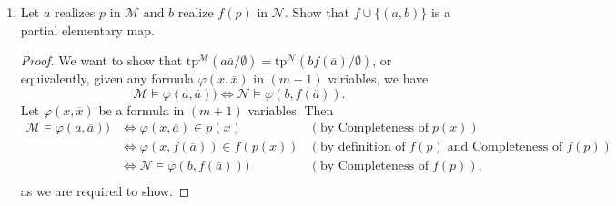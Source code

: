 \documentclass{article}
\begin{document}
\begin{enumerate}[label={\bf Q\arabic*:}]
\begin{enumerate}
        \begin{proof}
          Let $\overline{a}$ denote $(a_1,\ldots,a_m)$. Given any finite
          set of formulas
          $\varphi_1(x,f(\overline{a})),\ldots,\varphi_n(x,f(\overline{a}))$
          in $f(p)$, we need to show that $\mathcal{N}$ realizes their
          conjunction \[\varphi(x,f(\overline{a})):=
          \varphi_1(x,f(\overline{a}))\wedge
          \ldots\wedge\varphi_n(x,f(\overline{a})),\] or equivalently,
          \[\mathcal{N}\models\exists x\; \varphi(x,f(\overline{a})).\]
          Now for each $i\in\{1,\ldots,n\}$, $\varphi_i(x,\overline{a})$ is
          a formula in $p$ by definition of $f(p)$, therefore by
          Completeness and consistency of $p$, $\varphi(x,\overline{a})$ is
          also in $p$. In other words, $\mathcal{M}$ realizes
          $\varphi(x,\overline{a})$, or equivalently,
          \[\mathcal{M}\models\exists x\; \varphi(x,\overline{a}).\]
          Therefore
          $\exists x\; \varphi(x,\overline{x})\in
          \text{tp}^\mathcal{M}(\overline{a}/\emptyset)$, which implies
          $\exists x\; \varphi(x,\overline{x})\in
          \text{tp}^\mathcal{N}(f(\overline{a})/\emptyset)$ since
          $\text{tp}^\mathcal{M}(\overline{a}/\emptyset)=
          \text{tp}^\mathcal{N}(f(\overline{a})/\emptyset)$. Hence
          $\mathcal{N}\models\exists x\; \varphi(x,f(\overline{a}))$ as
          required.
        \end{proof}

      \item Let $a$ realizes $p$ in $\mathcal{M}$ and $b$ realize $f(p)$ in
        $\mathcal{N}$. Show that $f\cup\{(a,b)\}$ is a partial elementary
        map.
        \begin{proof}
          We want to show that
          $\text{tp}^\mathcal{M}(a\overline{a}/\emptyset)
          =\text{tp}^\mathcal{N}(bf(\overline{a})/\emptyset)$, or
          equivalently, given any formula $\varphi(x,\overline{x})$ in
          $(m+1)$ variables, we have
          \[\mathcal{M}\models\varphi(a,\overline{a}))\Leftrightarrow
          \mathcal{N}\models\varphi(b,f(\overline{a})).\]
          Let $\varphi(x,\overline{x})$ be a formula in $(m+1)$ variables.
          Then
          \begin{align*}
            \mathcal{M}\models\varphi(a,\overline{a}))  & \Leftrightarrow
            \varphi(x,\overline{a})\in p(x) & (\text{by Completeness of}\;
              p(x)) \\
              & \Leftrightarrow \varphi(x,f(\overline{a}))\in f(p(x)) &
              (\text{by definition of}\; f(p)\; \text{and Completeness
              of}\; f(p)) \\
              & \Leftrightarrow \mathcal{N}\models\varphi(b,f(\overline{a}))) &
              (\text{by Completeness of}\; f(p)), \\
          \end{align*}
          as we are required to show.
        \end{proof}
    \end{enumerate}


\end{enumerate}
\end{document}
